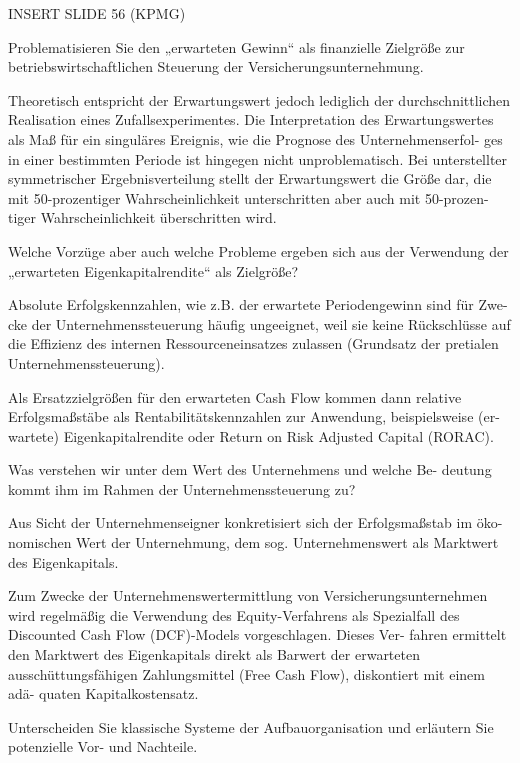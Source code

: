 INSERT SLIDE 56 (KPMG)



Problematisieren Sie den „erwarteten Gewinn“ als finanzielle Zielgröße
zur betriebswirtschaftlichen Steuerung der Versicherungsunternehmung.

Theoretisch entspricht der Erwartungswert jedoch lediglich der durchschnittlichen 
Realisation eines Zufallsexperimentes.
Die Interpretation des Erwartungswertes als Maß für ein singuläres Ereignis, wie die Prognose des Unternehmenserfol-
ges in einer bestimmten Periode ist hingegen nicht unproblematisch. Bei unterstellter 
symmetrischer Ergebnisverteilung stellt der Erwartungswert die Größe dar,
die mit 50-prozentiger Wahrscheinlichkeit unterschritten aber auch mit 50-prozen-
tiger Wahrscheinlichkeit überschritten wird.


Welche Vorzüge aber auch welche Probleme ergeben sich aus der Verwendung der 
„erwarteten Eigenkapitalrendite“ als Zielgröße?

Absolute Erfolgskennzahlen, wie z.B. der erwartete Periodengewinn sind für Zwe-
cke der Unternehmenssteuerung häufig ungeeignet, weil sie keine Rückschlüsse auf
die Effizienz des internen Ressourceneinsatzes zulassen (Grundsatz der pretialen
Unternehmenssteuerung).

Als Ersatzzielgrößen für den erwarteten Cash Flow kommen dann relative
Erfolgsmaßstäbe als Rentabilitätskennzahlen zur Anwendung, beispielsweise (er-
wartete) Eigenkapitalrendite oder Return on Risk Adjusted Capital (RORAC).


Was verstehen wir unter dem Wert des Unternehmens und welche Be-
deutung kommt ihm im Rahmen der Unternehmenssteuerung zu?

Aus Sicht der Unternehmenseigner konkretisiert sich der Erfolgsmaßstab im öko-
nomischen Wert der Unternehmung, dem sog. Unternehmenswert als Marktwert
des Eigenkapitals.

Zum Zwecke der Unternehmenswertermittlung von Versicherungsunternehmen wird 
regelmäßig die Verwendung des Equity-Verfahrens als
Spezialfall des Discounted Cash Flow (DCF)-Models vorgeschlagen. Dieses Ver-
fahren ermittelt den Marktwert des Eigenkapitals direkt als Barwert der erwarteten
ausschüttungsfähigen Zahlungsmittel (Free Cash Flow), diskontiert mit einem adä-
quaten Kapitalkostensatz.



Unterscheiden Sie klassische Systeme der Aufbauorganisation und erläutern Sie 
potenzielle Vor- und Nachteile.


